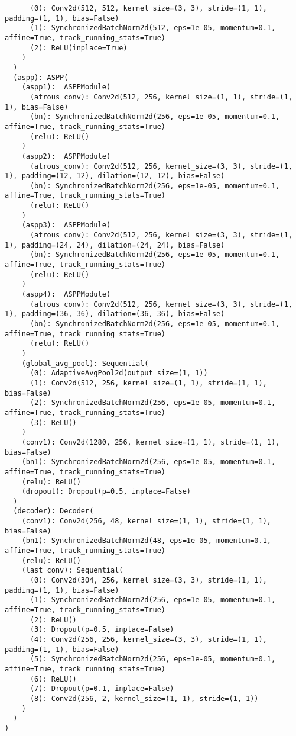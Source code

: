 \begin{verbatim}
      (0): Conv2d(512, 512, kernel_size=(3, 3), stride=(1, 1), padding=(1, 1), bias=False)
      (1): SynchronizedBatchNorm2d(512, eps=1e-05, momentum=0.1, affine=True, track_running_stats=True)
      (2): ReLU(inplace=True)
    )
  )
  (aspp): ASPP(
    (aspp1): _ASPPModule(
      (atrous_conv): Conv2d(512, 256, kernel_size=(1, 1), stride=(1, 1), bias=False)
      (bn): SynchronizedBatchNorm2d(256, eps=1e-05, momentum=0.1, affine=True, track_running_stats=True)
      (relu): ReLU()
    )
    (aspp2): _ASPPModule(
      (atrous_conv): Conv2d(512, 256, kernel_size=(3, 3), stride=(1, 1), padding=(12, 12), dilation=(12, 12), bias=False)
      (bn): SynchronizedBatchNorm2d(256, eps=1e-05, momentum=0.1, affine=True, track_running_stats=True)
      (relu): ReLU()
    )
    (aspp3): _ASPPModule(
      (atrous_conv): Conv2d(512, 256, kernel_size=(3, 3), stride=(1, 1), padding=(24, 24), dilation=(24, 24), bias=False)
      (bn): SynchronizedBatchNorm2d(256, eps=1e-05, momentum=0.1, affine=True, track_running_stats=True)
      (relu): ReLU()
    )
    (aspp4): _ASPPModule(
      (atrous_conv): Conv2d(512, 256, kernel_size=(3, 3), stride=(1, 1), padding=(36, 36), dilation=(36, 36), bias=False)
      (bn): SynchronizedBatchNorm2d(256, eps=1e-05, momentum=0.1, affine=True, track_running_stats=True)
      (relu): ReLU()
    )
    (global_avg_pool): Sequential(
      (0): AdaptiveAvgPool2d(output_size=(1, 1))
      (1): Conv2d(512, 256, kernel_size=(1, 1), stride=(1, 1), bias=False)
      (2): SynchronizedBatchNorm2d(256, eps=1e-05, momentum=0.1, affine=True, track_running_stats=True)
      (3): ReLU()
    )
    (conv1): Conv2d(1280, 256, kernel_size=(1, 1), stride=(1, 1), bias=False)
    (bn1): SynchronizedBatchNorm2d(256, eps=1e-05, momentum=0.1, affine=True, track_running_stats=True)
    (relu): ReLU()
    (dropout): Dropout(p=0.5, inplace=False)
  )
  (decoder): Decoder(
    (conv1): Conv2d(256, 48, kernel_size=(1, 1), stride=(1, 1), bias=False)
    (bn1): SynchronizedBatchNorm2d(48, eps=1e-05, momentum=0.1, affine=True, track_running_stats=True)
    (relu): ReLU()
    (last_conv): Sequential(
      (0): Conv2d(304, 256, kernel_size=(3, 3), stride=(1, 1), padding=(1, 1), bias=False)
      (1): SynchronizedBatchNorm2d(256, eps=1e-05, momentum=0.1, affine=True, track_running_stats=True)
      (2): ReLU()
      (3): Dropout(p=0.5, inplace=False)
      (4): Conv2d(256, 256, kernel_size=(3, 3), stride=(1, 1), padding=(1, 1), bias=False)
      (5): SynchronizedBatchNorm2d(256, eps=1e-05, momentum=0.1, affine=True, track_running_stats=True)
      (6): ReLU()
      (7): Dropout(p=0.1, inplace=False)
      (8): Conv2d(256, 2, kernel_size=(1, 1), stride=(1, 1))
    )
  )
)


\end{verbatim}
